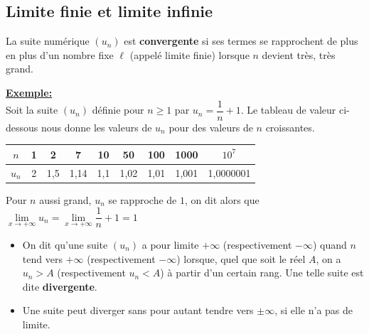 \documentclass[11pt,twoside, openany]{extbook}
\begin{document}
\subsection{Limite finie et limite infinie}

\begin{defi}
La suite numérique $(u_n)$ est \textbf{convergente} si ses termes se rapprochent de plus en plus d'un nombre fixe $\ell$ (appelé limite finie) lorsque $n$ devient très, très grand.
\center {}  
\end{defi}

\medskip
\noindent \textbf{\ul{Exemple:}}\\ Soit la suite $(u_n)$ définie pour $n\geqslant 1$ par $u_n=\dfrac{1}{n}+1$. Le tableau de valeur ci-dessous nous donne les valeurs de $u_n$ pour des valeurs de $n$ croissantes.
\begin{center}
{\renewcommand{\arraystretch}{0.9} %
{\setlength{\tabcolsep}{0.53cm} %
    \begin{tabular}{|c|c|c|c|c|c|c|c|c|}
\hline
$n$   & 1 & 2   & 7    & 10  & 50   & 100  & 1000  & $10^7$ \\ \hline
$u_n$ & 2 & 1,5 & 1,14 & 1,1 & 1,02 & 1,01 & 1,001 & 1,0000001 \\ \hline
\end{tabular}}} 
\end{center}
Pour $n$ aussi grand, $u_n$ se rapproche de $1$, on dit alors que $\lim\limits_{x \rightarrow +\infty} u_n= \lim\limits_{x \rightarrow +\infty} \dfrac{1}{n}+1 =1$

\begin{defi}
\begin{itemize}
    \item [$\bullet$] On dit qu'une suite $(u_n)$ a pour limite $+\infty$ (respectivement $-\infty$)  quand $n$ tend vers $+\infty$ (respectivement $-\infty$) lorsque, quel que soit le réel $A$, on a $u_n>A$ (respectivement $u_n<A$) à partir d'un certain rang. Une telle suite est dite \textbf{divergente}.\\
    \hspace*{2cm} 
    \item[$\bullet$] Une suite peut diverger sans pour autant tendre vers $\pm\infty$, si elle n'a pas de limite.  
\end{itemize}
\end{defi}
\end{document}
